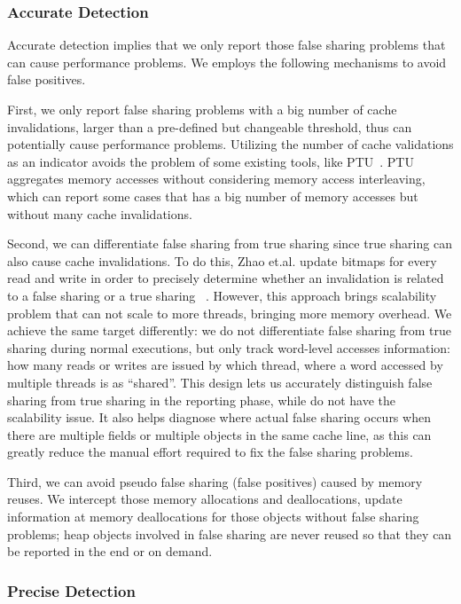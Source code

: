 \subsubsection{Accurate Detection}
\label{sec:accuratedetect}
Accurate detection implies that we only report those false sharing problems that can cause performance problems. We employs the following mechanisms to avoid false positives.

First, we only report false sharing problems with a big number of cache invalidations, larger than a pre-defined but changeable threshold, thus can potentially cause performance problems. Utilizing the number of cache validations as an indicator avoids the problem of some existing tools, like PTU~\cite{detect:ptu, detect:intel}. PTU aggregates memory accesses without considering memory access interleaving, which  can report some cases that has a big number of memory accesses but without many cache invalidations. 

Second, we can differentiate false sharing from true sharing since true sharing can also cause cache invalidations. To do this, Zhao et.al. update bitmaps for every read and write in order to precisely determine whether an invalidation is related to a false sharing or a true sharing ~\cite{qinzhao}. However, this approach brings scalability problem that can not scale to more threads, bringing more memory overhead. We achieve the same target differently: we do not differentiate false sharing from true sharing during normal executions, but only track word-level accesses information: how many reads or writes are issued by which thread, where a word accessed by multiple threads is as ``shared''. This design lets us accurately distinguish false sharing from true sharing in the reporting phase, while do not have the scalability issue. It also helps diagnose where actual false sharing occurs when there are multiple fields or multiple objects in the same cache line, as this can greatly reduce the manual effort required to fix the false sharing problems.

  
Third, we can avoid pseudo false sharing (false positives) caused by memory reuses.  We intercept those memory allocations and deallocations, update information at memory deallocations for those objects without false sharing problems; heap objects involved in false sharing are never reused so that they can be reported in the end or on demand.


\subsubsection{Precise Detection}
\label{sec:precisedetect}

